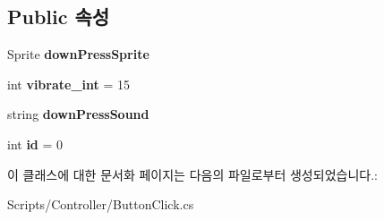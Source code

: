 \subsection*{Public 속성}
\begin{DoxyCompactItemize}
\item 
\hypertarget{class_button_click_a48a07b5034b25eef2a7baf6d205ee5a5}{}Sprite {\bfseries down\+Press\+Sprite}\label{class_button_click_a48a07b5034b25eef2a7baf6d205ee5a5}

\item 
\hypertarget{class_button_click_a67d83145735e80e3d861824de03c4316}{}int {\bfseries vibrate\+\_\+int} = 15\label{class_button_click_a67d83145735e80e3d861824de03c4316}

\item 
\hypertarget{class_button_click_aafe0162741cd71c14b72ebe03fe0497e}{}string {\bfseries down\+Press\+Sound}\label{class_button_click_aafe0162741cd71c14b72ebe03fe0497e}

\item 
\hypertarget{class_button_click_a688591097ac528d9d5b8fd70e98689bd}{}int {\bfseries id} = 0\label{class_button_click_a688591097ac528d9d5b8fd70e98689bd}

\end{DoxyCompactItemize}


이 클래스에 대한 문서화 페이지는 다음의 파일로부터 생성되었습니다.\+:\begin{DoxyCompactItemize}
\item 
Scripts/\+Controller/Button\+Click.\+cs\end{DoxyCompactItemize}
